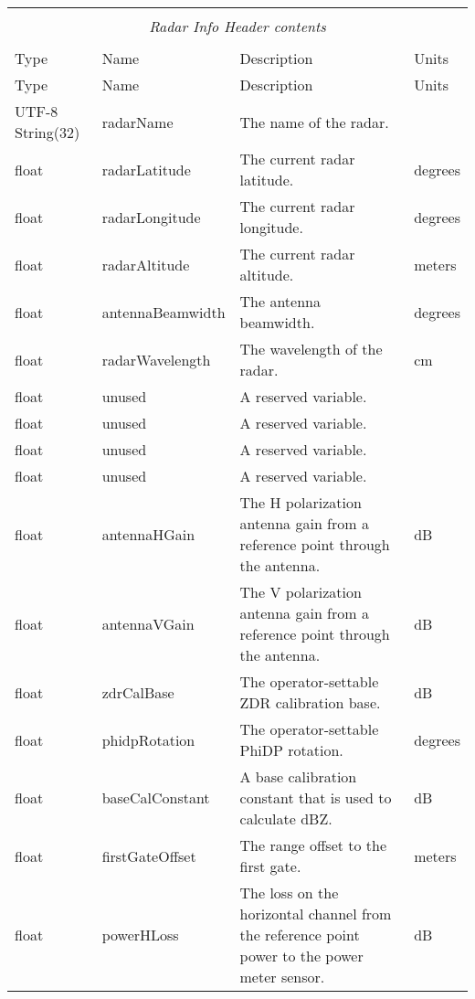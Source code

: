 \documentclass[10pt]{article}
\newcommand{\tblspc}{\rule{0pt}{3ex}}
\begin{document}
\begin{longtable}{|p{}|l|p{}|p{}|}
\hline
\multicolumn{4}{|c|}{} \\
\multicolumn{4}{|c|}{\emph{Radar Info Header contents}} \\
\multicolumn{4}{|c|}{} \\
\hline Type & Name & Description & Units \\ \hline \endfirsthead
\hline Type & Name & Description & Units \\ \hline \endhead
\hline \endfoot
\tblspc UTF-8 String(32) & radarName & The name of the radar. & \\
\hline
\tblspc float & radarLatitude & The current radar latitude. & degrees \\
\hline
\tblspc float & radarLongitude & The current radar longitude. & degrees \\
\hline
\tblspc float & radarAltitude & The current radar altitude. & meters \\
\hline
\tblspc float & antennaBeamwidth & The antenna beamwidth. & degrees \\
\hline
\tblspc float & radarWavelength & The wavelength of the radar. & cm \\
\hline
\tblspc float & unused & A reserved variable. & \\
\hline
\tblspc float & unused & A reserved variable. & \\
\hline
\tblspc float & unused & A reserved variable. & \\
\hline
\tblspc float & unused & A reserved variable. & \\
\hline
\tblspc float & antennaHGain & The H polarization antenna gain from a reference point through the antenna. & dB \\
\hline
\tblspc float & antennaVGain & The V polarization antenna gain from a reference point through the antenna. & dB \\
\hline
\tblspc float & zdrCalBase & The operator-settable ZDR calibration base. & dB \\
\hline
\tblspc float & phidpRotation & The operator-settable PhiDP rotation. & degrees \\
\hline
\tblspc float & baseCalConstant & A base calibration constant that is used to calculate dBZ. & dB \\
\hline
\tblspc float & firstGateOffset & The range offset to the first gate. & meters \\
\hline
\tblspc float & powerHLoss & The loss on the horizontal channel from the reference point power to the power meter sensor. & dB \\

\end{longtable}
\end{document}
